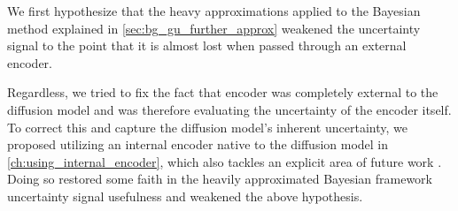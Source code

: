 We first hypothesize that the heavy approximations applied to the Bayesian method explained in \autoref{sec:bg_gu_further_approx} weakened the uncertainty signal to the point that it is almost lost when passed through an external encoder.

Regardless, we tried to fix the fact that encoder was completely external to the diffusion model and was therefore evaluating the uncertainty of the encoder itself. To correct this and capture the diffusion model's inherent uncertainty, we proposed utilizing an internal encoder native to the diffusion model in \autoref{ch:using_internal_encoder}, which also tackles an explicit area of future work \parencite{jazbec_generative_2025}.
Doing so restored some faith in the heavily approximated Bayesian framework uncertainty signal usefulness and weakened the above hypothesis.
